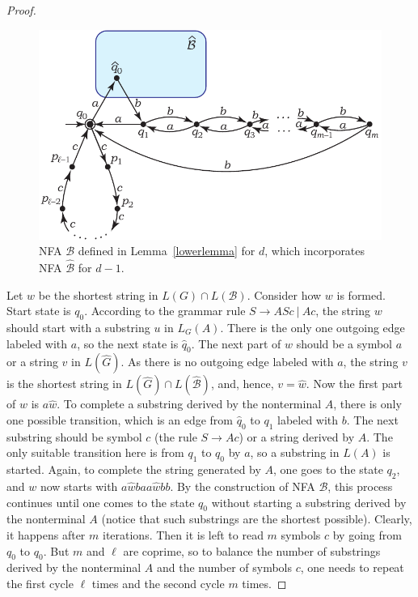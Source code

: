 \documentclass[runningheads]{llncs}
\begin{document}
\begin{proof}
\begin{figure}[t]
	\centering
	\includegraphics[scale=0.9]{rational_index_Ad}
	\caption{NFA $\mathcal{B}$ defined in Lemma~\ref{lowerlemma} for $d$,
		which incorporates NFA $\widehat{\mathcal{B}}$ for $d-1$.}
	\label{dimautomata:generalized}
\end{figure}

Let $w$ be the shortest string in $L(G) \cap L(\mathcal{B})$.
Consider how $w$ is formed.
Start state is $q_{0}$.
According to the grammar rule $S \to A S c\ \vert \ A c$,
the string $w$ should start with a substring $u$ in $L_G(A)$.
There is the only one outgoing edge labeled with $a$,
so the next state is $\widehat{q}_{0}$.
The next part of $w$ should be a symbol $a$
or a string $v$ in $L(\widehat{G})$.
As there is no outgoing edge labeled with $a$,
the string $v$ is the shortest string in $L(\widehat{G}) \cap L(\widehat{\mathcal{B}})$,
and, hence, $v = \widehat{w}$.
Now the first part of $w$ is $a \widehat{w}$.
To complete a substring derived by the nonterminal $A$,
there is only one possible transition,
which is an edge from $\widehat{q}_{0}$ to $q_1$ labeled with $b$.
The next substring should be symbol $c$ (the rule $S \to A c$) or a string derived by $A$.
The only suitable transition here is from $q_1$ to $q_0$ by $a$,
so a substring in $L(A)$ is started.
Again, to complete the string generated by $A$,
one goes to the state $q_2$,
and $w$ now starts with $a \widehat{w} b a a \widehat{w} b b$.
By the construction of NFA $\mathcal{B}$,
this process continues until one comes to the state $q_0$
without starting a substring derived by the nonterminal $A$
(notice that such substrings are the shortest possible).
Clearly, it happens after $m$ iterations.
Then it is left to read $m$ symbols $c$ by going from $q_0$ to $q_0$.
But $m$ and $\ell$ are coprime, so to balance the number of substrings
derived by the nonterminal $A$
and the number of symbols $c$,
one needs to repeat the first cycle $\ell$ times and the second cycle $m$ times.


\end{proof}
\end{document}
